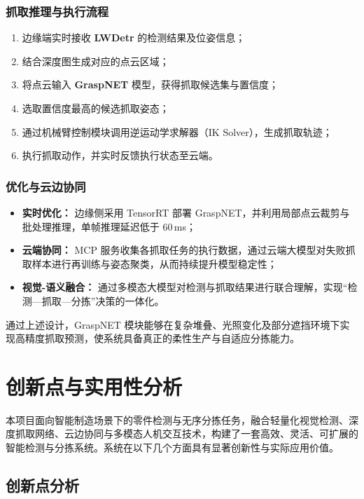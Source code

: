 \documentclass{cumcmthesis}
\begin{document}
\subsubsection{抓取推理与执行流程}

\begin{enumerate}
    \item 边缘端实时接收 \textbf{LWDetr} 的检测结果及位姿信息；
    \item 结合深度图生成对应的点云区域；
    \item 将点云输入 \textbf{GraspNET} 模型，获得抓取候选集与置信度；
    \item 选取置信度最高的候选抓取姿态；
    \item 通过机械臂控制模块调用逆运动学求解器（IK Solver），生成抓取轨迹；
    \item 执行抓取动作，并实时反馈执行状态至云端。
\end{enumerate}

\subsubsection{优化与云边协同}

\begin{itemize}
    \item \textbf{实时优化：} 边缘侧采用 TensorRT 部署 GraspNET，并利用局部点云裁剪与批处理推理，单帧推理延迟低于 60\,ms；
    \item \textbf{云端协同：} MCP 服务收集各抓取任务的执行数据，通过云端大模型对失败抓取样本进行再训练与姿态聚类，从而持续提升模型稳定性；
    \item \textbf{视觉-语义融合：} 通过多模态大模型对检测与抓取结果进行联合理解，实现“检测—抓取—分拣”决策的一体化。
\end{itemize}

通过上述设计，GraspNET 模块能够在复杂堆叠、光照变化及部分遮挡环境下实现高精度抓取预测，使系统具备真正的柔性生产与自适应分拣能力。


\section{创新点与实用性分析}

本项目面向智能制造场景下的零件检测与无序分拣任务，融合轻量化视觉检测、深度抓取网络、云边协同与多模态人机交互技术，构建了一套高效、灵活、可扩展的智能检测与分拣系统。系统在以下几个方面具有显著创新性与实际应用价值。

\subsection{创新点分析}
\end{document}
